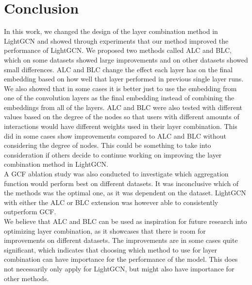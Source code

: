 \section{Conclusion}
In this work, we changed the design of the layer combination method in LightGCN and showed through experiments that our method improved the performance of LightGCN.
We proposed two methods called ALC and BLC, which on some datasets showed large improvements and on other datasets showed small differences.
ALC and BLC change the effect each layer has on the final embedding based on how well that layer performed in previous single layer runs.
We also showed that in some cases it is better just to use the embedding from one of the convolution layers as the final embedding instead of combining the embeddings from all of the layers.
ALC and BLC were also tested with different values based on the degree of the nodes so that users with different amounts of interactions would have different weights used in their layer combination.
This did in some cases show improvements compared to ALC and BLC without considering the degree of nodes.
This could be something to take into consideration if others decide to continue working on improving the layer combination method in LightGCN.\\
A GCF ablation study was also conducted to investigate which aggregation function would perform best on different datasets.
It was inconclusive which of the methods was the optimal one, as it was dependent on the dataset.
LightGCN with either the ALC or BLC extension was however able to consistently outperform GCF.\\
We believe that ALC and BLC can be used as inspiration for future research into optimizing layer combination, as it showcases that there is room for improvements on different datasets.
The improvements are in some cases quite significant, which indicates that choosing which method to use for layer combination can have importance for the performance of the model.
This does not necessarily only apply for LightGCN, but might also have importance for other methods.
